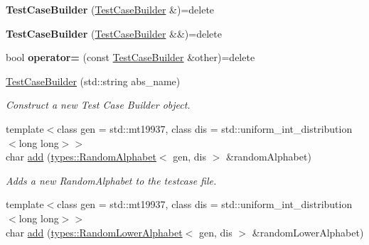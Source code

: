 \begin{DoxyCompactItemize}
\item 
\mbox{\label{classtestcaser_1_1maker_1_1TestCaseBuilder_a1fd3aaeb2829fa473f769b796958409b}} 
{\bfseries Test\+Case\+Builder} (\mbox{\hyperlink{classtestcaser_1_1maker_1_1TestCaseBuilder}{Test\+Case\+Builder}} \&)=delete
\item 
\mbox{\label{classtestcaser_1_1maker_1_1TestCaseBuilder_a8844b0c922621007832f3059e927ceb0}} 
{\bfseries Test\+Case\+Builder} (\mbox{\hyperlink{classtestcaser_1_1maker_1_1TestCaseBuilder}{Test\+Case\+Builder}} \&\&)=delete
\item 
\mbox{\label{classtestcaser_1_1maker_1_1TestCaseBuilder_a30942af2a74179d27ff693917ff4a98f}} 
bool {\bfseries operator=} (const \mbox{\hyperlink{classtestcaser_1_1maker_1_1TestCaseBuilder}{Test\+Case\+Builder}} \&other)=delete
\item 
\mbox{\hyperlink{classtestcaser_1_1maker_1_1TestCaseBuilder_a1faa00929cc5be8c8bbb312541858e61}{Test\+Case\+Builder}} (std\+::string abs\+\_\+name)
\begin{DoxyCompactList}\small\item\em Construct a new Test Case Builder object. \end{DoxyCompactList}\item 
{\footnotesize template$<$class gen  = std\+::mt19937, class dis  = std\+::uniform\+\_\+int\+\_\+distribution$<$long long$>$$>$ }\\char \mbox{\hyperlink{classtestcaser_1_1maker_1_1TestCaseBuilder_a26c5a045c2b1c4db64f4542aaee326aa}{add}} (\mbox{\hyperlink{classtestcaser_1_1maker_1_1types_1_1RandomAlphabet}{types\+::\+Random\+Alphabet}}$<$ gen, dis $>$ \&random\+Alphabet)
\begin{DoxyCompactList}\small\item\em Adds a new Random\+Alphabet to the testcase file. \end{DoxyCompactList}\item 
{\footnotesize template$<$class gen  = std\+::mt19937, class dis  = std\+::uniform\+\_\+int\+\_\+distribution$<$long long$>$$>$ }\\char \mbox{\hyperlink{classtestcaser_1_1maker_1_1TestCaseBuilder_a0666074618ac122218a4206b5952ca07}{add}} (\mbox{\hyperlink{classtestcaser_1_1maker_1_1types_1_1RandomLowerAlphabet}{types\+::\+Random\+Lower\+Alphabet}}$<$ gen, dis $>$ \&random\+Lower\+Alphabet)

\end{DoxyCompactItemize}

